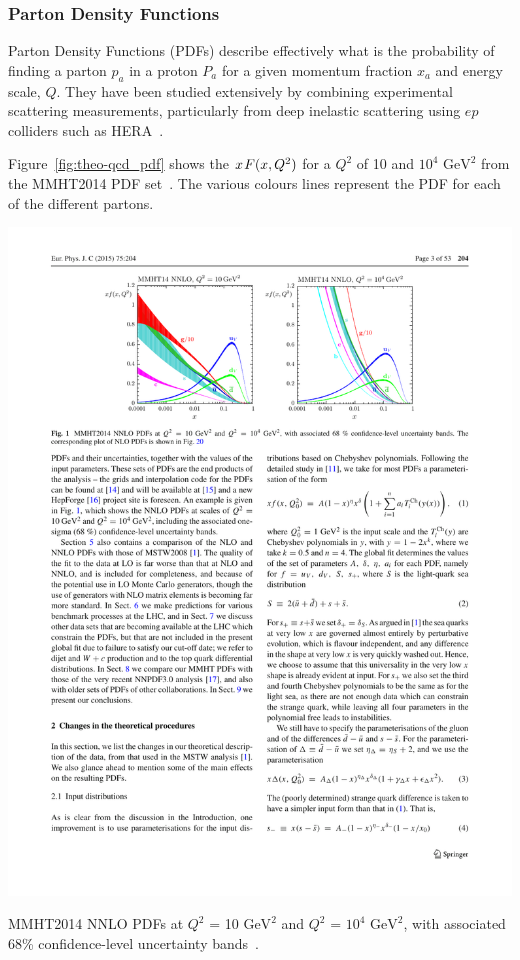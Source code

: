 \newpage
\subsubsection{Parton Density Functions}
\label{sec:theo-qcd_pdf}

Parton Density Functions (PDFs) describe effectively what is the probability of finding a parton $p_a$ in a proton $P_a$
for a given momentum fraction $x_a$ and energy scale, $Q$.
They have been studied extensively
by combining experimental scattering measurements,
particularly from deep inelastic scattering using $ep$ colliders such as HERA~\cite{theo-qcd_hera}.

Figure~\ref{fig:theo-qcd_pdf} shows the $x\hspace{0.3mm}F(x,Q^2)$ for a $Q^2$ of 10 and $10^4$ $\text{GeV}^2$
from the MMHT2014 PDF set~\cite{theo-qcd_pdf}.
The various colours lines represent the PDF for each of the different partons.

\begin{table}[!hbt]
  \begin{center}
    \includegraphics[width=1\linewidth, angle=0]{figs/Theory/qcd_pdf.pdf}
  \end{center}
  \caption[MMHT2014 NNLO PDFs at $Q^2$ = 10 $\text{GeV}^2$ and $Q^2$ = $10^4$ $\text{GeV}^2$, with associated 68\% confidence-level uncertainty bands.]
  {MMHT2014 NNLO PDFs at $Q^2$ = 10 $\text{GeV}^2$ and $Q^2$ = $10^4$ $\text{GeV}^2$, with associated 68\% confidence-level uncertainty bands~\cite{theo-qcd_pdf}.}
  \label{fig:theo-qcd_pdf}
\end{table}


